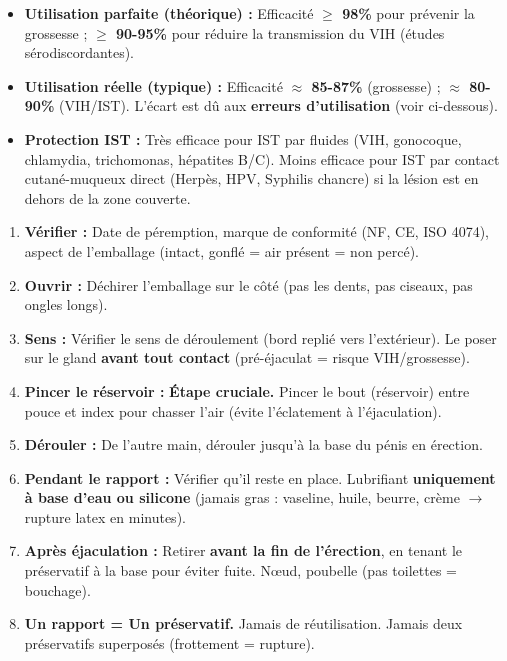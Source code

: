 \documentclass[11pt]{article}
\begin{document}
\begin{propriete}
\begin{itemize}
    \item \textbf{Utilisation parfaite (théorique) :} Efficacité \textbf{$\ge$ 98\%} pour prévenir la grossesse ; \textbf{$\ge$ 90-95\%} pour réduire la transmission du VIH (études sérodiscordantes).
    \item \textbf{Utilisation réelle (typique) :} Efficacité \textbf{$\approx$ 85-87\%} (grossesse) ; \textbf{$\approx$ 80-90\%} (VIH/IST). L'écart est dû aux \textbf{erreurs d'utilisation} (voir ci-dessous).
    \item \textbf{Protection IST :} Très efficace pour IST par fluides (VIH, gonocoque, chlamydia, trichomonas, hépatites B/C). Moins efficace pour IST par contact cutané-muqueux direct (Herpès, HPV, Syphilis chancre) si la lésion est en dehors de la zone couverte.
\end{itemize}
\end{propriete}

\begin{methode}
\begin{enumerate}
    \item \textbf{Vérifier :} Date de péremption, marque de conformité (NF, CE, ISO 4074), aspect de l'emballage (intact, gonflé = air présent = non percé).
    \item \textbf{Ouvrir :} Déchirer l'emballage sur le côté (pas les dents, pas ciseaux, pas ongles longs).
    \item \textbf{Sens :} Vérifier le sens de déroulement (bord replié vers l'extérieur). Le poser sur le gland \textbf{avant tout contact} (pré-éjaculat = risque VIH/grossesse).
    \item \textbf{Pincer le réservoir :} \textbf{Étape cruciale.} Pincer le bout (réservoir) entre pouce et index pour chasser l'air (évite l'éclatement à l'éjaculation).
    \item \textbf{Dérouler :} De l'autre main, dérouler jusqu'à la base du pénis en érection.
    \item \textbf{Pendant le rapport :} Vérifier qu'il reste en place. Lubrifiant \textbf{uniquement à base d'eau ou silicone} (jamais gras : vaseline, huile, beurre, crème $\rightarrow$ rupture latex en minutes).
    \item \textbf{Après éjaculation :} Retirer \textbf{avant la fin de l'érection}, en tenant le préservatif à la base pour éviter fuite. Nœud, poubelle (pas toilettes = bouchage).
    \item \textbf{Un rapport = Un préservatif.} Jamais de réutilisation. Jamais deux préservatifs superposés (frottement = rupture).
\end{enumerate}
\end{methode}
\end{document}
